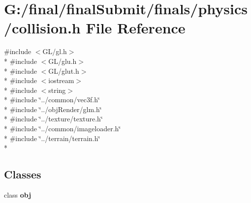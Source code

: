 \section{G\-:/final/final\-Submit/finals/physics/collision.h File Reference}
\label{collision_8h}
{\ttfamily \#include $<$G\-L/gl.\-h$>$}\\*
{\ttfamily \#include $<$G\-L/glu.\-h$>$}\\*
{\ttfamily \#include $<$G\-L/glut.\-h$>$}\\*
{\ttfamily \#include $<$iostream$>$}\\*
{\ttfamily \#include $<$string$>$}\\*
{\ttfamily \#include \char`\"{}../common/vec3f.\-h\char`\"{}}\\*
{\ttfamily \#include \char`\"{}../obj\-Render/glm.\-h\char`\"{}}\\*
{\ttfamily \#include \char`\"{}../texture/texture.\-h\char`\"{}}\\*
{\ttfamily \#include \char`\"{}../common/imageloader.\-h\char`\"{}}\\*
{\ttfamily \#include \char`\"{}../terrain/terrain.\-h\char`\"{}}\\*
\subsection*{Classes}
\begin{DoxyCompactItemize}
\item 
class {\bf obj}
\end{DoxyCompactItemize}
